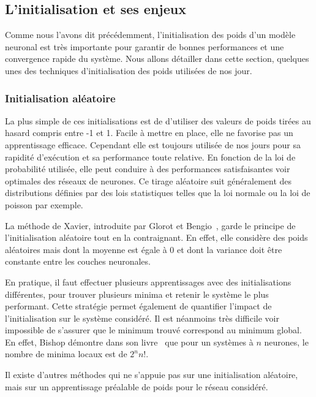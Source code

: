 \subsection{L'initialisation et ses enjeux}
Comme nous l'avons dit précédemment, l'initialisation des poids d'un modèle neuronal est très importante pour garantir de bonnes performances et une convergence rapide du système. Nous allons détailler dans cette section, quelques unes des techniques d'initialisation des poids utilisées de nos jour.


\subsubsection{Initialisation aléatoire}
La plus simple de ces initialisations est de d’utiliser des valeurs de poids tirées au hasard compris entre -1 et 1. Facile à mettre en place, elle ne favorise pas un apprentissage efficace. Cependant elle est toujours utilisée de nos jours pour sa rapidité d'exécution et sa performance toute relative. En fonction de la loi de probabilité utilisée, elle peut conduire à des performances satisfaisantes voir optimales des réseaux de neurones. Ce tirage aléatoire suit généralement des distributions définies par des lois statistiques telles que la loi normale ou la loi de poisson par exemple.

La méthode de Xavier, introduite par Glorot et Bengio~\cite{Glorot2010}, garde le principe de l'initialisation aléatoire tout en la contraignant. En effet, elle considère des poids aléatoires mais dont la moyenne est égale à $0$ et dont la variance doit être constante entre les couches neuronales.

En pratique, il faut effectuer plusieurs apprentissages avec des initialisations différentes, pour trouver plusieurs minima et retenir le système le plus performant. Cette stratégie permet également de quantifier l'impact de l'initialisation sur le système considéré. Il est néanmoins très difficile voir impossible de s'assurer que le minimum trouvé correspond au minimum global. En effet, Bishop démontre dans son livre~\cite{Bishop2006} que pour un systèmes à $n$ neurones, le nombre de minima locaux est de $2^n n!$.

Il existe d'autres méthodes qui ne s'appuie pas sur une initialisation aléatoire, mais sur un apprentissage préalable de poids pour le réseau considéré.

